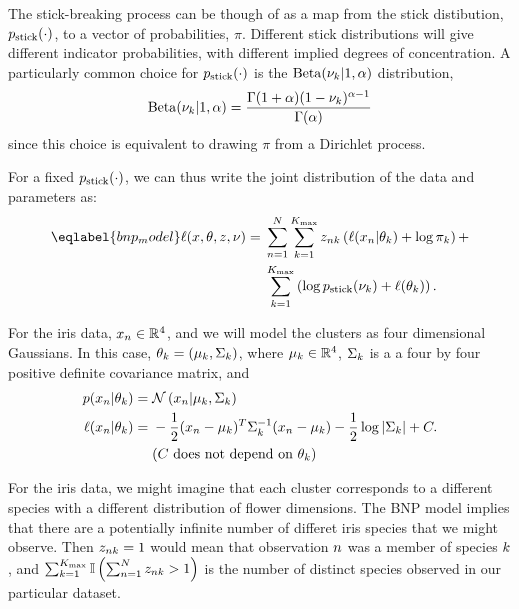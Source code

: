 The stick-breaking process can be though of as a map from  the stick
distibution, $p_{\mathrm{stick}}(\cdot)$, to a vector of probabilities, $\pi$. Different
stick distributions will give different indicator probabilities, with different
implied degrees of concentration.  A particularly common choice for
$p_{\mathrm{stick}}(\cdot)$ is the $\mathrm{Beta}(\nu_k \vert 1, \alpha)$ distribution,
%
\begin{align*}
%
\mathrm{Beta}(\nu_\k \vert 1, \alpha) =
    \frac{\Gamma(1 + \alpha) (1 - \nu_\k)^{\alpha - 1}}
         {\Gamma(\alpha)}
%
\end{align*}
%
since this choice is equivalent to drawing $\pi$ from a Dirichlet process.

For a fixed $p_{\mathrm{stick}}(\cdot)$, we can thus write the joint distribution of
the data and parameters as:
%
\begin{align}\eqlabel{bnp_model}
%
\logp(\x, \theta, \z, \nu) ={}&
    \sum_{n=1}^N \sum_{k=1}^{\kmax}
        \z_{\n\k} \left(
            \logp(\x_n \vert \theta_\k) + \log \pi_\k
        \right) +
\nonumber \\ {}&
    \sum_{k=1}^{\kmax} \left(
        \log \pstick(\nu_\k) + \logp(\theta_\k)
    \right).
%
\end{align}
%

\begin{ex}
%
For the iris data, $x_n \in \mathbb{R}^4$, and we will model the clusters as
four dimensional Gaussians.  In this case, $\theta_k = (\mu_k, \Sigma_k)$,
where $\mu_k \in \mathbb{R}^4$, $\Sigma_k$ is a a four by four positive
definite covariance matrix, and
%
\begin{align*}
%
p(\x_\n \vert \theta_\k) ={}& \norm{\x_n \vert \mu_\k, \Sigma_\k} \\
\logp(\x_\n \vert \theta_\k) ={}&
    -\frac{1}{2}(\x_n - \mu_k)^T \Sigma_\k^{-1} (\x_n - \mu_k)
    -\frac{1}{2} \log |\Sigma_\k| + \const.\\
    & \constdesc{\theta_\k}
%
\end{align*}

For the iris data, we might imagine that each cluster corresponds to a different
species with a different distribution of flower dimensions.  The BNP model
implies that there are a potentially infinite number of differet iris species
that we might observe.  Then $z_{nk} = 1$ would mean that observation $n$
was a member of species $k$, and $\sum_{k=1}^{K_{\mathrm{max}}} \mathbb{I}\left( \sum_{n=1}^{N}
z_{nk} > 1\right)$ is the number of distinct species observed in our particular
dataset.
%
\end{ex}
